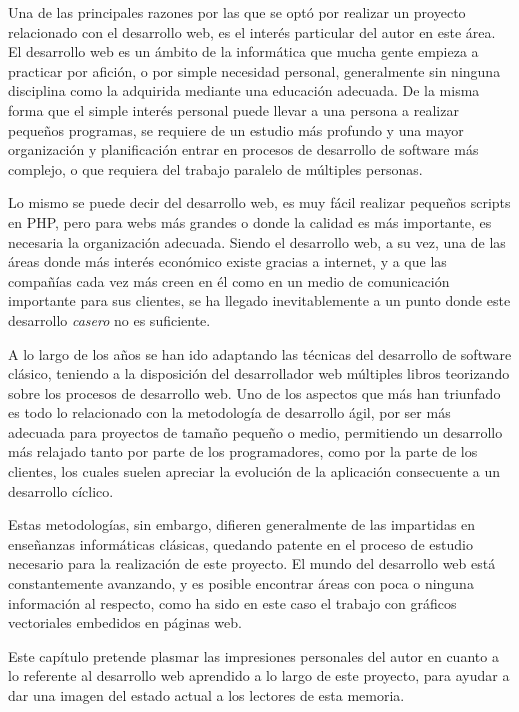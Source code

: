 
Una de las principales razones por las que se optó por realizar un proyecto relacionado con el desarrollo web, es el interés particular del autor en este área. El desarrollo web es un ámbito de la informática que mucha gente empieza a practicar por afición, o por simple necesidad personal, generalmente sin ninguna disciplina como la adquirida mediante una educación adecuada. De la misma forma que el simple interés personal puede llevar a una persona a realizar pequeños programas, se requiere de un estudio más profundo y una mayor organización y planificación entrar en procesos de desarrollo de software más complejo, o que requiera del trabajo paralelo de múltiples personas.

Lo mismo se puede decir del desarrollo web, es muy fácil realizar pequeños scripts en PHP, pero para webs más grandes o donde la calidad es más importante, es necesaria la organización adecuada. Siendo el desarrollo web, a su vez, una de las áreas donde más interés económico existe gracias a internet, y a que las compañías cada vez más creen en él como en un medio de comunicación importante para sus clientes, se ha llegado inevitablemente a un punto donde este desarrollo \emph{casero} no es suficiente.

A lo largo de los años se han ido adaptando las técnicas del desarrollo de software clásico, teniendo a la disposición del desarrollador web múltiples libros teorizando sobre los procesos de desarrollo web. Uno de los aspectos que más han triunfado es todo lo relacionado con la metodología de desarrollo ágil, por ser más adecuada para proyectos de tamaño pequeño o medio, permitiendo un desarrollo más relajado tanto por parte de los programadores, como por la parte de los clientes, los cuales suelen apreciar la evolución de la aplicación consecuente a un desarrollo cíclico.

Estas metodologías, sin embargo, difieren generalmente de las impartidas en enseñanzas informáticas clásicas, quedando patente en el proceso de estudio necesario para la realización de este proyecto. El mundo del desarrollo web está constantemente avanzando, y es posible encontrar áreas con poca o ninguna información al respecto, como ha sido en este caso el trabajo con gráficos vectoriales embedidos en páginas web.

Este capítulo pretende plasmar las impresiones personales del autor en cuanto a lo referente al desarrollo web aprendido a lo largo de este proyecto, para ayudar a dar una imagen del estado actual a los lectores de esta memoria.

